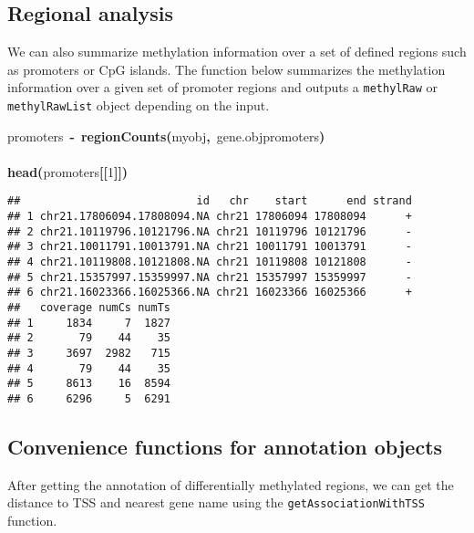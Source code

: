 \documentclass{article}
\makeatletter
\newcommand{\hlnumber}[1]{\textcolor[rgb]{0,0,0}{#1}}%
\newcommand{\hlfunctioncall}[1]{\textcolor[rgb]{.5,0,.33}{\textbf{#1}}}%
\newcommand{\hlkeyword}[1]{\textbf{#1}}%
\newcommand{\hlassignement}[1]{\textbf{#1}}%
\newcommand{\hlsymbol}[1]{#1}%
\newcommand{\hlstd}[1]{\textcolor[rgb]{0,0,0}{#1}}%
\newenvironment{kframe}{%
 \def\FrameCommand##1{\hskip\@totalleftmargin \hskip-\fboxsep
 \colorbox{shadecolor}{##1}\hskip-\fboxsep
     \hskip-\linewidth \hskip-\@totalleftmargin \hskip\columnwidth}%
 \MakeFramed {\advance\hsize-\width
   \@totalleftmargin\z@ \linewidth\hsize
   \@setminipage}}%
 {\par\unskip\endMakeFramed}
\newenvironment{knitrout}{}{} %
\makeatother
\begin{document}
\subsection{Regional analysis}
We can also summarize methylation information over a set of defined regions such as promoters or CpG islands. The function below summarizes the methylation information over a given set of promoter regions and outputs a \texttt{methylRaw} or \texttt{methylRawList} object depending on the input.

\begin{knitrout}
\color{fgcolor}\begin{kframe}
\begin{flushleft}
\ttfamily\noindent
\hlsymbol{promoters}{\ }\hlassignement{\usebox{\hlnormalsizeboxlessthan}-}{\ }\hlfunctioncall{regionCounts}\hlkeyword{(}\hlsymbol{myobj}\hlkeyword{,}{\ }\hlsymbol{gene.obj}\hlkeyword{\usebox{\hlnormalsizeboxdollar}}\hlsymbol{promoters}\hlkeyword{)}\hspace*{\fill}\\
\hlstd{}\hspace*{\fill}\\
\hlstd{}\hlfunctioncall{head}\hlkeyword{(}\hlsymbol{promoters}\hlkeyword{[[}\hlnumber{1}\hlkeyword{]}\hlkeyword{]}\hlkeyword{)}\mbox{}
\normalfont
\end{flushleft}
\begin{verbatim}
##                           id   chr    start      end strand
## 1 chr21.17806094.17808094.NA chr21 17806094 17808094      +
## 2 chr21.10119796.10121796.NA chr21 10119796 10121796      -
## 3 chr21.10011791.10013791.NA chr21 10011791 10013791      -
## 4 chr21.10119808.10121808.NA chr21 10119808 10121808      -
## 5 chr21.15357997.15359997.NA chr21 15357997 15359997      -
## 6 chr21.16023366.16025366.NA chr21 16023366 16025366      +
##   coverage numCs numTs
## 1     1834     7  1827
## 2       79    44    35
## 3     3697  2982   715
## 4       79    44    35
## 5     8613    16  8594
## 6     6296     5  6291
\end{verbatim}
\end{kframe}
\end{knitrout}




\subsection{Convenience functions for annotation objects}
After getting the annotation of differentially methylated regions, we can get the distance to TSS and nearest gene name using the \texttt{getAssociationWithTSS} function.
\end{document}
